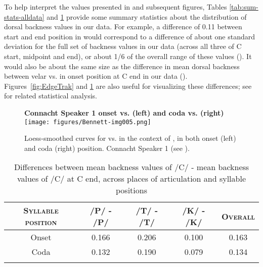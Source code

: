 \documentclass[output=paper,colorlinks,citecolor=brown]{langscibook}
\newcommand{\pal}{\ipa{ʲ}}
\newcommand{\vel}{\ipa{ˠ}}
\begin{document}
To help interpret the values presented in  and subsequent figures, Tables \ref{tab:sum-stats-alldata} and \ref{tab:sum-stats-palvel} provide some summary statistics about the distribution of dorsal backness values in our data. For example, a difference of 0.11 between start and end position in  would correspond to a difference of about one standard deviation for the full set of backness values in our data (across all three of C start, midpoint and end), or about 1/6 of the overall range of these values (). It would also be about the same size as the difference in mean dorsal backness between velar \ipa{/K\pal/} vs. \ipa{/K\vel/} in onset position at C end in our data (). Figures~\ref{fig:EdgeTrak} and \ref{fig:loess} are also useful for visualizing these differences; see  for related statistical analysis.

\begin{figure}
    \centering
    \textbf{Connacht Speaker 1 onset  vs.  (left) and coda  vs.  (right)}\\
    \texttt{[image: figures/Bennett-img005.png]}
    \caption{Loess-smoothed curves for \ipa{/P\pal/} vs. \ipa{/P\vel/} in the context of , in both onset (left) and coda (right) position. Connacht Speaker 1 (see ).}
    \label{fig:loess}
\end{figure}

\begin{table}[ht]
\caption{Summary statistics for distributions of dorsal backness values in our data. \textsc{sd} = standard deviation, \textsc{IQ range} = inter-quartile range, $\Delta$\textsc{(X)} = size of range for \textsc{X}.}\label{tab:sum-stats-alldata}
\end{table}



\begin{table}[ht]
\begin{tabular}{ccccc}
\lsptoprule
  \textsc{Syllable position}& /P\pal/ - /P\vel/ & /T\pal/ - /T\vel/& /K\pal/ - /K\vel/ & \textsc{Overall}\\ 
  \midrule
  Onset & 0.166 & 0.206 & 0.100 & 0.163\\
  Coda & 0.132 & 0.190 & 0.079 & 0.134\\
\lspbottomrule
\end{tabular}
\caption{Differences between mean backness values of /C\pal/ - mean backness values of /C\vel/ at C end, across places of articulation and syllable positions}\label{tab:sum-stats-palvel}
\end{table}
\end{document}
